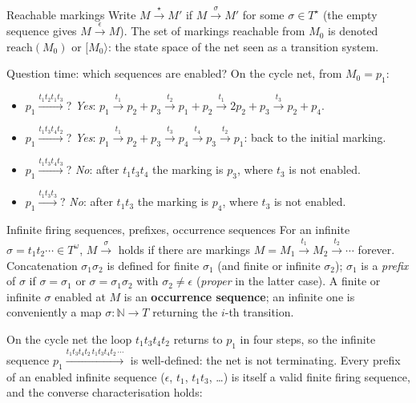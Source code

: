 \begin{definitionbox}{Reachable markings}
Write $M \xrightarrow{\star} M'$ if $M \xrightarrow{\sigma} M'$ for some $\sigma \in T^\star$ (the empty sequence gives $M \xrightarrow{\epsilon} M$). The set of markings reachable from $M_0$ is denoted $\mathrm{reach}(M_0)$ or $[M_0\rangle$: the state space of the net seen as a transition system.
\end{definitionbox}

\begin{examplebox}{Question time: which sequences are enabled?}
On the cycle net, from $M_0 = p_1$:
\begin{itemize}
  \item $p_1 \xrightarrow{t_1 t_2 t_1 t_3}$? \emph{Yes}: $p_1 \xrightarrow{t_1} p_2 + p_3 \xrightarrow{t_2} p_1 + p_2 \xrightarrow{t_1} 2p_2 + p_3 \xrightarrow{t_3} p_2 + p_4$.
  \item $p_1 \xrightarrow{t_1 t_3 t_4 t_2}$? \emph{Yes}: $p_1 \xrightarrow{t_1} p_2 + p_3 \xrightarrow{t_3} p_4 \xrightarrow{t_4} p_3 \xrightarrow{t_2} p_1$: back to the initial marking.
  \item $p_1 \xrightarrow{t_1 t_3 t_4 t_3}$? \emph{No}: after $t_1 t_3 t_4$ the marking is $p_3$, where $t_3$ is not enabled.
  \item $p_1 \xrightarrow{t_1 t_3 t_3}$? \emph{No}: after $t_1 t_3$ the marking is $p_4$, where $t_3$ is not enabled.
\end{itemize}
\end{examplebox}

\begin{definitionbox}{Infinite firing sequences, prefixes, occurrence sequences}
For an infinite $\sigma = t_1 t_2 \cdots \in T^\omega$, $M \xrightarrow{\sigma}$ holds if there are markings $M = M_1 \xrightarrow{t_1} M_2 \xrightarrow{t_2} \cdots$ forever. Concatenation $\sigma_1 \sigma_2$ is defined for finite $\sigma_1$ (and finite or infinite $\sigma_2$); $\sigma_1$ is a \emph{prefix} of $\sigma$ if $\sigma = \sigma_1$ or $\sigma = \sigma_1 \sigma_2$ with $\sigma_2 \neq \epsilon$ (\emph{proper} in the latter case). A finite or infinite $\sigma$ enabled at $M$ is an \textbf{occurrence sequence}; an infinite one is conveniently a map $\sigma : \mathbb{N} \to T$ returning the $i$-th transition.
\end{definitionbox}

On the cycle net the loop $t_1 t_3 t_4 t_2$ returns to $p_1$ in four steps, so the infinite sequence $p_1 \xrightarrow{t_1 t_3 t_4 t_2\, t_1 t_3 t_4 t_2\, \cdots}$ is well-defined: the net is not terminating. Every prefix of an enabled infinite sequence ($\epsilon$, $t_1$, $t_1 t_3$, \dots) is itself a valid finite firing sequence, and the converse characterisation holds:

